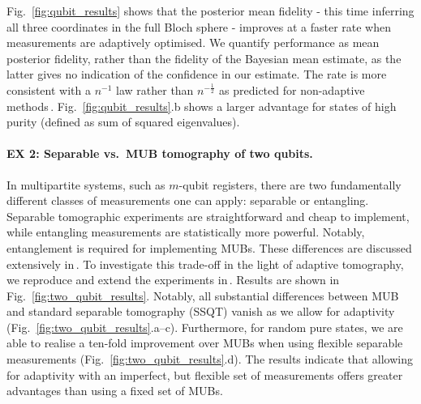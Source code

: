 Fig.\ \ref{fig:qubit_results} shows that the posterior mean fidelity - this time inferring all three coordinates in the full Bloch sphere - improves at a faster rate when measurements are adaptively optimised. We quantify performance as mean posterior fidelity, rather than the fidelity of the Bayesian mean estimate, as the latter gives no indication of the confidence in our estimate. The rate is more consistent with a $n^{-1}$ law rather than $n^{-\frac{1}{2}}$ as predicted for non-adaptive methods\,\cite[][and refs.]{MUBExperiment}. Fig.\ \ref{fig:qubit_results}.b shows a larger advantage for states of high purity (defined as sum of squared eigenvalues).

\paragraph{EX 2: Separable vs.\ MUB tomography of two qubits.} In multipartite systems, such as $m$-qubit registers, there are two fundamentally different classes of measurements one can apply: separable or entangling. Separable tomographic experiments are straightforward and cheap to implement, while entangling measurements are statistically more powerful. Notably, entanglement is required for implementing MUBs. These differences are discussed extensively in\,\cite{MUBExperiment}. To investigate this trade-off in the light of adaptive tomography, we reproduce and extend the experiments in\,\cite{MUBExperiment}. Results are shown in Fig.\ \ref{fig:two_qubit_results}. Notably, all substantial differences between MUB and standard separable tomography (SSQT) vanish as we allow for adaptivity (Fig.\ \ref{fig:two_qubit_results}.a--c). Furthermore, for random pure states, we are able to realise a ten-fold improvement over MUBs when using flexible separable measurements (Fig.\ \ref{fig:two_qubit_results}.d). The results indicate that allowing for adaptivity with an imperfect, but flexible set of measurements offers greater advantages than using a fixed set of MUBs.


